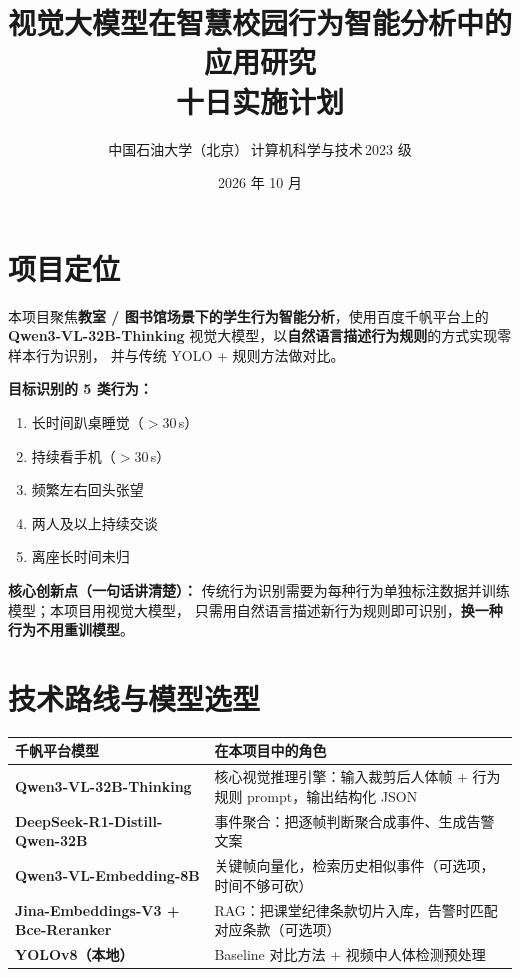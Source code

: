 \documentclass[12pt,a4paper]{ctexart}
\title{视觉大模型在智慧校园行为智能分析中的应用研究\\[4pt]
\large 十日实施计划}
\author{中国石油大学（北京）\,计算机科学与技术\,2023 级}
\date{2026 年 10 月}
\begin{document}
\maketitle

\section{项目定位}

本项目聚焦\textbf{教室 / 图书馆场景下的学生行为智能分析}，使用百度千帆平台上的
\textbf{Qwen3-VL-32B-Thinking} 视觉大模型，以\textbf{自然语言描述行为规则}的方式实现零样本行为识别，
并与传统 YOLO + 规则方法做对比。

\textbf{目标识别的 5 类行为：}
\begin{enumerate}
  \item 长时间趴桌睡觉（$>$30\,s）
  \item 持续看手机（$>$30\,s）
  \item 频繁左右回头张望
  \item 两人及以上持续交谈
  \item 离座长时间未归
\end{enumerate}

\textbf{核心创新点（一句话讲清楚）：}
传统行为识别需要为每种行为单独标注数据并训练模型；本项目用视觉大模型，
只需用自然语言描述新行为规则即可识别，\textbf{换一种行为不用重训模型}。

\section{技术路线与模型选型}

\renewcommand{\arraystretch}{1.3}
\begin{table}[h]
\centering
\begin{tabular}{>{\bfseries}p{4.5cm} p{8.5cm}}
\toprule
千帆平台模型 & 在本项目中的角色 \\
\midrule
Qwen3-VL-32B-Thinking & 核心视觉推理引擎：输入裁剪后人体帧 + 行为规则 prompt，输出结构化 JSON \\
DeepSeek-R1-Distill-Qwen-32B & 事件聚合：把逐帧判断聚合成事件、生成告警文案 \\
Qwen3-VL-Embedding-8B & 关键帧向量化，检索历史相似事件（可选项，时间不够可砍）\\
Jina-Embeddings-V3 + Bce-Reranker & RAG：把课堂纪律条款切片入库，告警时匹配对应条款（可选项）\\
YOLOv8（本地） & Baseline 对比方法 + 视频中人体检测预处理 \\
\bottomrule
\end{tabular}
\end{table}
\end{document}
